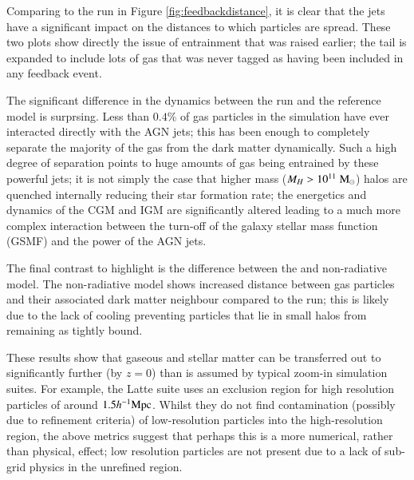 Comparing to the \nojet{} run in Figure \ref{fig:feedbackdistance}, it is clear
that the jets have a significant impact on the distances to which particles
are spread. These two plots show directly the issue of entrainment that was
raised earlier; the tail is expanded to include lots of gas that was never
tagged as having been included in any feedback event.

The significant difference in the dynamics between the \nojet{} run and the
reference model is surprsing. Less than $0.4\%$ of gas particles in the simulation
have ever interacted directly with the AGN jets; this has been enough
to completely separate the majority of the gas from the dark matter dynamically.
Such a high degree of separation points to huge amounts of gas being entrained
by these powerful jets; it is not simply the case that higher mass ($M_H >
10^{11} \;{\rm M}_{\odot}{}$) halos are quenched internally reducing their star formation
rate; the energetics and dynamics of the CGM and IGM are significantly altered
leading to a much more complex interaction between the turn-off of the
galaxy stellar mass function (GSMF) and the power of the AGN jets.

The final contrast to highlight is the difference between the \nojet{} and
non-radiative model. The non-radiative model shows increased distance between
gas particles and their associated dark matter neighbour compared to the
\nojet{} run; this is likely due to the lack of cooling preventing particles
that lie in small halos from remaining as tightly bound.

These results show that gaseous and stellar matter can be transferred out
to significantly further (by $z=0$) than is assumed by typical zoom-in simulation
suites. For example, the Latte \citep{Wetzel2016} suite uses an exclusion region
for high resolution particles of around $1.5 h^{-1}{\rm Mpc}{}$. Whilst they do not find
contamination (possibly due to refinement criteria) of low-resolution particles
into the high-resolution region, the above metrics suggest that perhaps this is
a more numerical, rather than physical, effect; low resolution particles are
not present due to a lack of sub-grid physics in the unrefined region.
